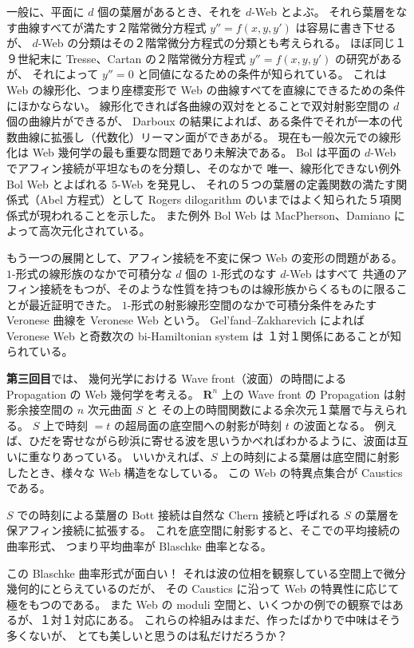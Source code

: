 \documentclass[uplatex,dvipdfmx]{jlreq}
\begin{document}
一般に、平面に $d$ 個の葉層があるとき、それを $d$-Web とよぶ。
それら葉層をなす曲線すべてが満たす２階常微分方程式 $y'' = f(x,y,y')$ は容易に書き下せるが、
$d$-Web の分類はその２階常微分方程式の分類とも考えられる。
ほぼ同じ１９世紀末に Tresse、Cartan の２階常微分方程式 $y'' = f(x,y,y')$ の研究があるが、
それによって $y'' = 0$ と同値になるための条件が知られている。
これは Web の線形化、つまり座標変形で Web の曲線すべてを直線にできるための条件にほかならない。
線形化できれば各曲線の双対をとることで双対射影空間の $d$ 個の曲線片ができるが、
Darboux の結果によれば、ある条件でそれが一本の代数曲線に拡張し（代数化）リーマン面ができあがる。
現在も一般次元での線形化は Web 幾何学の最も重要な問題であり未解決である。
Bol は平面の $d$-Web でアフィン接続が平坦なものを分類し、そのなかで
唯一、線形化できない例外 Bol Web とよばれる $5$-Web を発見し、
それの５つの葉層の定義関数の満たす関係式（Abel 方程式）として
Rogers dilogarithm のいまではよく知られた５項関係式が現われることを示した。
また例外 Bol Web は MacPherson、Damiano によって高次元化されている。

もう一つの展開として、アフィン接続を不変に保つ Web の変形の問題がある。
$1$-形式の線形族のなかで可積分な $d$ 個の $1$-形式のなす $d$-Web はすべて
共通のアフィン接続をもつが、そのような性質を持つものは線形族からくるものに限ることが最近証明できた。
$1$-形式の射影線形空間のなかで可積分条件をみたす Veronese 曲線を Veronese Web という。
Gel'fand--Zakharevich によれば Veronese Web と奇数次の bi-Hamiltonian system は
１対１関係にあることが知られている。

\bigskip

\noindent\textbf{第三回目}では、
幾何光学における Wave front（波面）の時間による Propagation の Web 幾何学を考える。
$\mathbf{R}^n$ 上の Wave front の Propagation は射影余接空間の $n$ 次元曲面 $S$ と
その上の時間関数による余次元１葉層で与えられる。
$S$ 上で時刻 $= t$ の超局面の底空間への射影が時刻 $t$ の波面となる。
例えば、ひだを寄せながら砂浜に寄せる波を思いうかべればわかるように、波面は互いに重なりあっている。
いいかえれば、$S$ 上の時刻による葉層は底空間に射影したとき、様々な Web 構造をなしている。
この Web の特異点集合が Caustics である。

$S$ での時刻による葉層の Bott 接続は自然な Chern 接続と呼ばれる $S$ の葉層を保アフィン接続に拡張する。
これを底空間に射影すると、そこでの平均接続の曲率形式、
つまり平均曲率が Blaschke 曲率となる。

この Blaschke 曲率形式が面白い！
それは波の位相を観察している空間上で微分幾何的にとらえているのだが、
その Caustics に沿って Web の特異性に応じて極をもつのである。
また Web の moduli 空間と、いくつかの例での観察ではあるが、１対１対応にある。
これらの枠組みはまだ、作ったばかりで中味はそう多くないが、
とても美しいと思うのは私だけだろうか？
\end{document}
